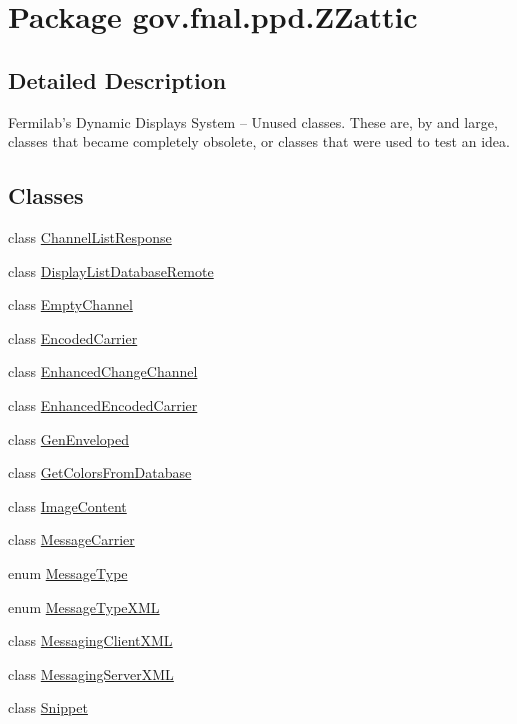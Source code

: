 \hypertarget{namespacegov_1_1fnal_1_1ppd_1_1ZZattic}{\section{Package gov.\-fnal.\-ppd.\-Z\-Zattic}
\label{namespacegov_1_1fnal_1_1ppd_1_1ZZattic}
}


\subsection{Detailed Description}
Fermilab's Dynamic Displays System -- Unused classes. These are, by and large, classes that became completely obsolete, or classes that were used to test an idea. \subsection*{Classes}
\begin{DoxyCompactItemize}
\item 
class \hyperlink{classgov_1_1fnal_1_1ppd_1_1ZZattic_1_1ChannelListResponse}{Channel\-List\-Response}
\item 
class \hyperlink{classgov_1_1fnal_1_1ppd_1_1ZZattic_1_1DisplayListDatabaseRemote}{Display\-List\-Database\-Remote}
\item 
class \hyperlink{classgov_1_1fnal_1_1ppd_1_1ZZattic_1_1EmptyChannel}{Empty\-Channel}
\item 
class \hyperlink{classgov_1_1fnal_1_1ppd_1_1ZZattic_1_1EncodedCarrier}{Encoded\-Carrier}
\item 
class \hyperlink{classgov_1_1fnal_1_1ppd_1_1ZZattic_1_1EnhancedChangeChannel}{Enhanced\-Change\-Channel}
\item 
class \hyperlink{classgov_1_1fnal_1_1ppd_1_1ZZattic_1_1EnhancedEncodedCarrier}{Enhanced\-Encoded\-Carrier}
\item 
class \hyperlink{classgov_1_1fnal_1_1ppd_1_1ZZattic_1_1GenEnveloped}{Gen\-Enveloped}
\item 
class \hyperlink{classgov_1_1fnal_1_1ppd_1_1ZZattic_1_1GetColorsFromDatabase}{Get\-Colors\-From\-Database}
\item 
class \hyperlink{classgov_1_1fnal_1_1ppd_1_1ZZattic_1_1ImageContent}{Image\-Content}
\item 
class \hyperlink{classgov_1_1fnal_1_1ppd_1_1ZZattic_1_1MessageCarrier}{Message\-Carrier}
\item 
enum \hyperlink{enumgov_1_1fnal_1_1ppd_1_1ZZattic_1_1MessageType}{Message\-Type}
\item 
enum \hyperlink{enumgov_1_1fnal_1_1ppd_1_1ZZattic_1_1MessageTypeXML}{Message\-Type\-X\-M\-L}
\item 
class \hyperlink{classgov_1_1fnal_1_1ppd_1_1ZZattic_1_1MessagingClientXML}{Messaging\-Client\-X\-M\-L}
\item 
class \hyperlink{classgov_1_1fnal_1_1ppd_1_1ZZattic_1_1MessagingServerXML}{Messaging\-Server\-X\-M\-L}
\item 
class \hyperlink{classgov_1_1fnal_1_1ppd_1_1ZZattic_1_1Snippet}{Snippet}
\end{DoxyCompactItemize}
